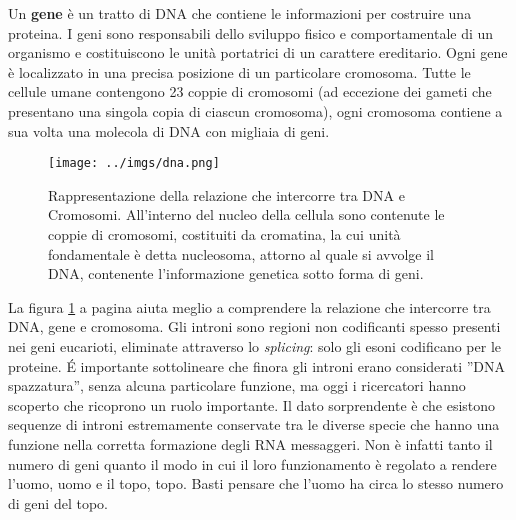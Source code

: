 Un \textbf{gene} è un tratto di DNA che contiene le informazioni per costruire una proteina. I geni sono responsabili dello sviluppo fisico e comportamentale di un organismo e costituiscono le unità portatrici di un carattere ereditario. 
Ogni gene è localizzato in una precisa posizione di un particolare cromosoma. 
Tutte le cellule umane contengono 23 coppie di cromosomi (ad eccezione dei gameti che presentano una singola copia di ciascun cromosoma), ogni cromosoma contiene a sua volta una molecola di DNA con migliaia di geni.

\begin{figure}[h]
\begin{center}
\texttt{[image: ../imgs/dna.png]}
\caption[I Cromosomi e il DNA]{Rappresentazione della relazione che intercorre tra DNA e Cromosomi. All'interno del nucleo della cellula sono contenute le coppie di cromosomi, costituiti da cromatina, la cui unità fondamentale è detta nucleosoma, attorno al quale si avvolge il DNA, contenente l'informazione genetica sotto forma di geni.}
\label{Fig:dnachromosome}
\end{center}
\end{figure}

La figura \ref{Fig:dnachromosome} a pagina \pageref{Fig:dnachromosome} aiuta meglio a comprendere la relazione che intercorre tra DNA, gene e cromosoma. 
Gli introni sono regioni non codificanti spesso presenti nei geni eucarioti, eliminate attraverso lo \textit{splicing}: solo gli esoni codificano per le proteine. 
\'E importante sottolineare che finora gli introni erano considerati ''DNA spazzatura'', senza alcuna particolare funzione, ma oggi i ricercatori hanno scoperto che ricoprono un ruolo importante. 
Il dato sorprendente è che esistono sequenze di introni estremamente conservate tra le diverse specie che hanno una funzione nella corretta formazione degli RNA messaggeri. Non è infatti tanto il numero di geni quanto il modo in cui il loro funzionamento è regolato a rendere l'uomo, uomo e il topo, topo. Basti pensare che l'uomo ha circa lo stesso numero di geni del topo.

